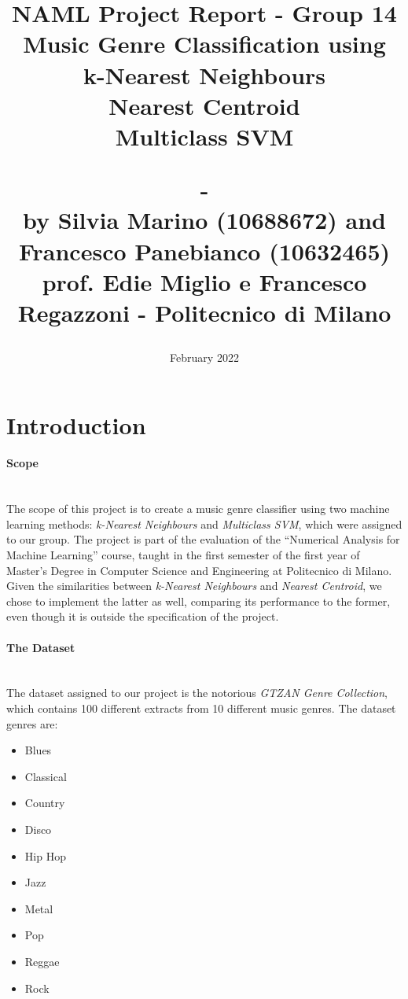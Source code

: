 \documentclass[12pt]{article}
\begin{document}
	\title{NAML Project Report - Group 14\\\vspace{20pt}
		\Large{Music Genre Classification using}\\
		\large{k-Nearest Neighbours\\ Nearest Centroid\\ Multiclass SVM}\\
		\date{February 2022}
		\large{-\\}
		\large{by Silvia Marino (10688672) and Francesco Panebianco (10632465)\\}
		\small{prof. Edie Miglio e Francesco Regazzoni - Politecnico di Milano}
	}
	\maketitle
	\tableofcontents
	\newpage
	\section{Introduction}
	\paragraph{Scope}\mbox{}\\\newline
	The scope of this project is to create a music genre classifier using two machine learning methods: \textit{k-Nearest Neighbours} and \textit{Multiclass SVM}, which were assigned to our group. The project is part of the evaluation of the “Numerical Analysis for Machine Learning” course, taught in the first semester of the first year of Master’s Degree in Computer Science and Engineering at Politecnico di Milano. Given the similarities between \textit{k-Nearest Neighbours} and \textit{Nearest Centroid}, we chose to implement the latter as well, comparing its performance to the former, even though it is outside the specification of the project.\\ 
	
	\paragraph{The Dataset}\mbox{}\\\newline
	The dataset assigned to our project is the notorious \textit{GTZAN Genre Collection}\cite{marsyas}, which contains 100 different extracts from 10 different music genres. The dataset genres are: 
	
	\begin{itemize}
		\item Blues 
		\item Classical 
		\item Country 
		\item Disco 
		\item Hip Hop 	
		\item Jazz 
		\item Metal 
		\item Pop 
		\item Reggae 
		\item Rock 
	\end{itemize}
\end{document}
